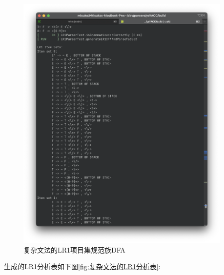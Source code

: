 \begin{figure}[ht!]
	\begin{center}
		\includegraphics[width=0.95\textwidth]{figures/lr1规范族1.png}
	\end{center}
	\caption{复杂文法的LR1项目集规范族DFA}
	\label{fig:复杂文法的LR1项目集规范族DFA}
\end{figure}

生成的LR1分析表如下图\ref{fig:复杂文法的LR1分析表}:

